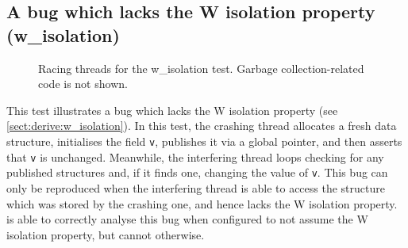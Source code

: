 
\subsection{A bug which lacks the W isolation property (w\_isolation)}

\begin{figure}
  \centerline{
    {\hfill}
    {\hfill}
    {\hfill}
  }
  \caption{Racing threads for the w\_isolation test.  Garbage
    collection-related code is not shown.}
  \label{fig:w_isolation}
\end{figure}

This test illustrates a bug which lacks the W isolation property (see
\autoref{sect:derive:w_isolation}).  In this test, the crashing
thread allocates a fresh data structure, initialises the field
\texttt{v}, publishes it via a global pointer, and then asserts that
\texttt{v} is unchanged.  Meanwhile, the interfering thread loops
checking for any published structures and, if it finds one, changing
the value of \texttt{v}.  This bug can only be reproduced when the
interfering thread is able to access the structure which was stored by
the crashing one, and hence lacks the W isolation property.
{\Implementation} is able to correctly analyse this bug when
configured to not assume the W isolation property, but cannot
otherwise.

